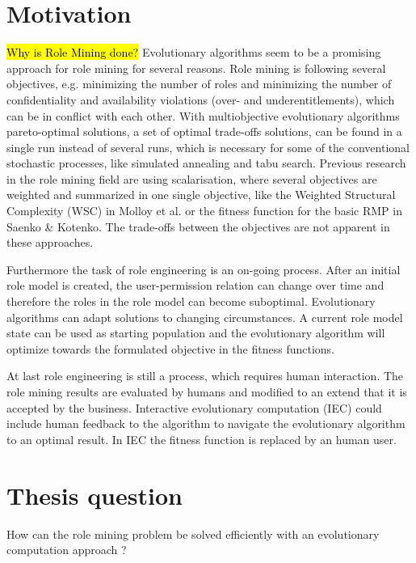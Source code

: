 \section{Motivation}
\hl{Why is Role Mining done?}
Evolutionary algorithms seem to be a promising approach for role mining for several reasons. Role mining is following several objectives, e.g. minimizing the number of roles and minimizing the number of confidentiality and availability violations (over- and underentitlements), which can be in conflict with each other. With multiobjective evolutionary algorithms pareto-optimal solutions, a set of optimal trade-offs solutions, can be found in a single run instead of several runs, which is necessary for some of the conventional stochastic processes, like simulated annealing and tabu search\cite{abraham2005evolutionary}. Previous research in the role mining field are using scalarisation, where several objectives are weighted and summarized in one single objective, like the Weighted Structural Complexity (WSC) in Molloy et al.\cite{Molloy} or the fitness function for the basic RMP in Saenko \& Kotenko\cite{saenko2012design}. The trade-offs between the objectives are not apparent in these approaches.

Furthermore the task of role engineering is an on-going process. After an initial role model is created, the user-permission relation can change over time and therefore the roles in the role model can become suboptimal. Evolutionary algorithms can adapt solutions to changing circumstances\cite{Fogel:1997}. A current role model state can be used as starting population and the evolutionary algorithm will optimize towards the formulated objective in the fitness functions.

At last role engineering is still a process, which requires human interaction. The role mining results are evaluated by humans and modified to an extend that it is accepted by the business. Interactive evolutionary computation (IEC)\cite{949485} could include human feedback to the algorithm to navigate the evolutionary algorithm to an optimal result. In IEC the fitness function is replaced by an human user.

\section{Thesis question}
How can the role mining problem be solved efficiently with an evolutionary computation approach ?

